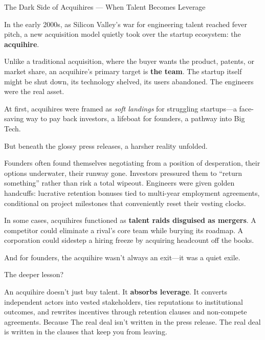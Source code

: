 \begin{HistoricalSidebar}{The Dark Side of Acquihires --- When Talent Becomes Leverage}

  In the early 2000s, as Silicon Valley’s war for engineering talent reached fever pitch, a new acquisition model 
  quietly took over the startup ecosystem: the \textbf{acquihire}.

  \medskip
  
  Unlike a traditional acquisition, where the buyer wants the product, patents, or market share, an acquihire’s primary 
  target is \textbf{the team}. The startup itself might be shut down, its technology shelved, its users abandoned. The 
  engineers were the real asset.

  \medskip
  
  At first, acquihires were framed as \textit{soft landings} for struggling startups—a face-saving way to pay back 
  investors, a lifeboat for founders, a pathway into Big Tech.

  \medskip
  
  But beneath the glossy press releases, a harsher reality unfolded.

  \medskip
  
  Founders often found themselves negotiating from a position of desperation, their options underwater, their runway gone. 
  Investors pressured them to “return something” rather than risk a total wipeout. Engineers were given golden handcuffs: 
  lucrative retention bonuses tied to multi-year employment agreements, conditional on project milestones that conveniently 
  reset their vesting clocks.

  \medskip
  
  In some cases, acquihires functioned as \textbf{talent raids disguised as mergers}. A competitor could eliminate a rival’s 
  core team while burying its roadmap. A corporation could sidestep a hiring freeze by acquiring headcount off the books.

  \medskip
  
  And for founders, the acquihire wasn’t always an exit—it was a quiet exile.
  
  \medskip
  
  The deeper lesson?

  \medskip
  
  An acquihire doesn’t just buy talent. It \textbf{absorbs leverage}. It converts independent actors into vested stakeholders, 
  ties reputations to institutional outcomes, and rewrites incentives through retention clauses and non-compete agreements.
  Because The real deal isn’t written in the press release.  The real deal is written in the clauses that keep you from leaving.
  
\end{HistoricalSidebar}

